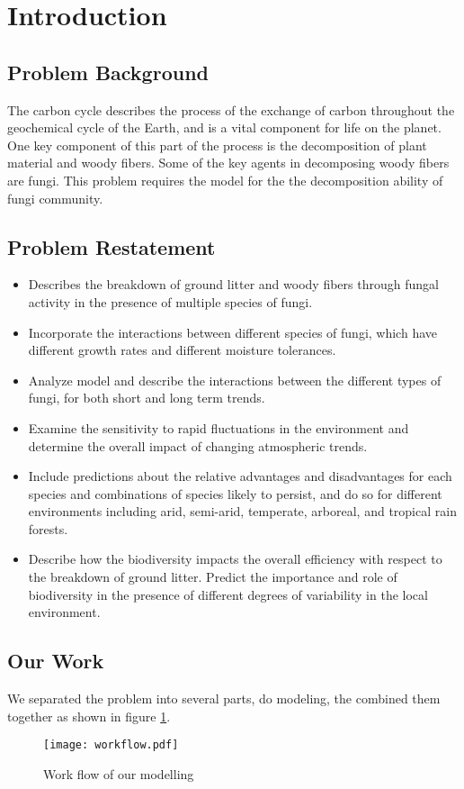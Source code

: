 \section{Introduction}\label{sec:intro}

\subsection{Problem Background}

The carbon cycle describes the process of the exchange of carbon throughout the geochemical cycle of the Earth, and is a vital component for life on the planet. One key component of this part of the process is the decomposition of plant material and woody fibers. Some of the key agents in decomposing woody fibers are fungi. This problem requires the model for the the decomposition ability of fungi community.

\subsection{Problem Restatement}
\begin{itemize}
    \item Describes the breakdown of ground litter and woody fibers through fungal activity in the presence of multiple species of fungi.
    \item Incorporate the interactions between different species of fungi, which have different growth rates and different moisture tolerances.
    \item Analyze model and describe the interactions between the different types of fungi, for both short and long term trends.
    \item Examine the sensitivity to rapid fluctuations in the environment and determine the overall impact of changing atmospheric trends.
    \item Include predictions about the relative advantages and disadvantages for each species and combinations of species likely to persist, and do so for different environments including arid, semi-arid, temperate, arboreal, and tropical rain forests.
    \item Describe how the biodiversity impacts the overall efficiency with respect to the breakdown of ground litter. Predict the importance and role of biodiversity in the presence of different degrees of variability in the local environment.
\end{itemize}


\subsection{Our Work}

We separated the problem into several parts, do modeling, the combined them together as shown in figure \ref{fig:workflow}.

\begin{figure}[ht]
    \caption{Work flow of our modelling}\label{fig:workflow}
    \begin{center}
        \texttt{[image: workflow.pdf]}
    \end{center}\end{figure}
